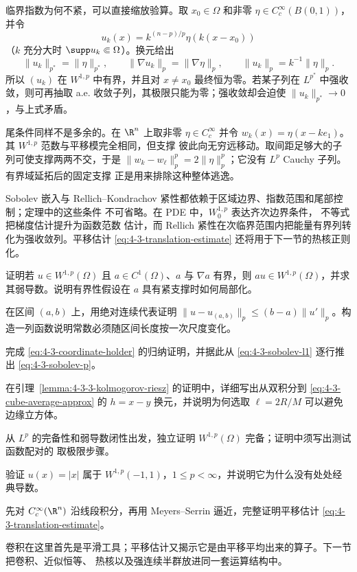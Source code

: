 临界指数为何不紧，可以直接缩放验算。取 $x_0\in\Omega$ 和非零
$\eta\in C_c^\infty(B(0,1))$，并令
\[
 u_k(x)=k^{(n-p)/p}\eta(k(x-x_0))
\]
（$k$ 充分大时 $\supp u_k\Subset\Omega$）。换元给出
\[
 \|u_k\|_{p^*}=\|\eta\|_{p^*},\qquad
 \|\nabla u_k\|_p=\|\nabla\eta\|_p,\qquad
 \|u_k\|_p=k^{-1}\|\eta\|_p.
\]
所以 $(u_k)$ 在 $W^{1,p}$ 中有界，并且对 $x\ne x_0$ 最终恒为零。若某子列在
$L^{p^*}$ 中强收敛，则可再抽取 a.e. 收敛子列，其极限只能为零；强收敛却会迫使
$\|u_k\|_{p^*}\to0$，与上式矛盾。

尾条件同样不是多余的。在 $\R^n$ 上取非零
$\eta\in C_c^\infty$ 并令 $w_k(x)=\eta(x-ke_1)$。其 $W^{1,p}$ 范数与平移模完全相同，但支撑
彼此向无穷远移动。取间距足够大的子列可使支撑两两不交，于是
$\|w_k-w_\ell\|_p^p=2\|\eta\|_p^p$；它没有 $L^p$ Cauchy 子列。有界域延拓后的固定支撑
正是用来排除这种整体逃逸。

Sobolev 嵌入与 Rellich--Kondrachov 紧性都依赖于区域边界、指数范围和尾部控制；定理中的这些条件
不可省略。在 PDE 中，$W_0^{1,p}$ 表达齐次边界条件，\Poincare{} 不等式把梯度估计提升为函数范数
估计，而 Rellich 紧性在次临界范围内把能量有界列转化为强收敛列。平移估计
\eqref{eq:4-3-translation-estimate} 还将用于下一节的热核正则化。

\begin{exercise}
证明若 $u\in W^{1,p}(\Omega)$ 且 $a\in C^1(\Omega)$、$a$ 与 $\nabla a$ 有界，则
$au\in W^{1,p}(\Omega)$，并求其弱导数。说明有界性假设在 $a$ 具有紧支撑时如何局部化。
\end{exercise}

\begin{exercise}
在区间 $(a,b)$ 上，用绝对连续代表证明
$\|u-u_{(a,b)}\|_p\leq(b-a)\|u'\|_p$。构造一列函数说明常数必须随区间长度按一次尺度变化。
\end{exercise}

\begin{exercise}
完成 \eqref{eq:4-3-coordinate-holder} 的归纳证明，并据此从
\eqref{eq:4-3-sobolev-l1} 逐行推出 \eqref{eq:4-3-sobolev-p}。
\end{exercise}

\begin{exercise}
在引理~\ref{lemma:4-3-3-kolmogorov-riesz} 的证明中，详细写出从双积分到
\eqref{eq:4-3-cube-average-approx} 的 $h=x-y$ 换元，并说明为何选取
$\ell=2R/M$ 可以避免边缘立方体。
\end{exercise}

\begin{exercise}
从 $L^p$ 的完备性和弱导数闭性出发，独立证明 $W^{1,p}(\Omega)$ 完备；证明中须写出测试函数配对的
取极限步骤。
\end{exercise}

\begin{exercise}
验证 $u(x)=|x|$ 属于 $W^{1,p}(-1,1)$，$1\leq p<\infty$，并说明它为什么没有处处经典导数。
\end{exercise}

\begin{exercise}
先对 $C_c^\infty(\R^n)$ 沿线段积分，再用 Meyers--Serrin 逼近，完整证明平移估计
\eqref{eq:4-3-translation-estimate}。
\end{exercise}

卷积在这里首先是平滑工具；平移估计又揭示它是由平移平均出来的算子。下一节把卷积、近似恒等、
热核以及强连续半群放进同一套运算结构中。

